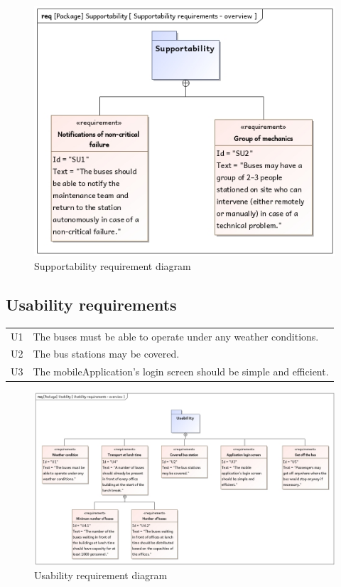 \documentclass[a4paper]{article}
\begin{document}
\begin{figure}
	\centering
	\includegraphics[width=.75\textwidth]{req-supportability.jpg}
	\caption{Supportability requirement diagram}%
	\label{fig:req-supportability}
\end{figure}

\subsection{Usability requirements}
\begin{tabularx}{\textwidth}{p{.9cm} X}
        U1 & The buses must be able to operate under any weather conditions. \\

        U2 & The bus \gls{station}s may be covered. \\

	U3 & The \gls{mobileApplication}’s login screen should be simple and
	     efficient. \\
\end{tabularx}

\begin{figure}
	\centering
	\includegraphics[width=\textwidth]{req-usability.jpg} %
	\caption{Usability requirement diagram}%
	\label{fig:req-usability}
\end{figure}
\end{document}
